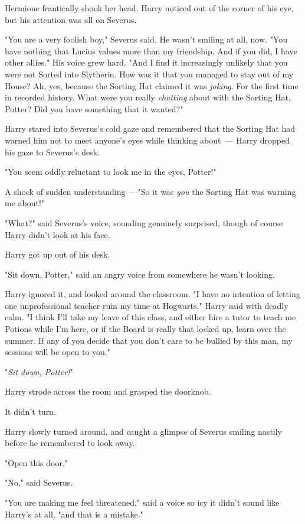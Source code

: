 Hermione frantically shook her head. Harry noticed out of the corner of his
eye, but his attention was all on Severus.

"You are a very foolish boy," Severus said. He wasn't smiling at all, now. "You
have nothing that Lucius values more than my friendship. And if you did, I have
other allies." His voice grew hard. "And I find it increasingly unlikely that
you were not Sorted into Slytherin. How was it that you managed to stay out of
my House? Ah, yes, because the Sorting Hat claimed it was \emph{joking}. For
the first time in recorded history. What were you really \emph{chatting} about
with the Sorting Hat, Potter? Did you have something that it wanted?"

Harry stared into Severus's cold gaze and remembered that the Sorting Hat had
warned him not to meet anyone's eyes while thinking about~--- Harry dropped his
gaze to Severus's desk.

"You seem oddly reluctant to look me in the eyes, Potter!"

A shock of sudden understanding~---"So it was \emph{you} the Sorting Hat was
warning me about!"

"What?" said Severus's voice, sounding genuinely surprised, though of course
Harry didn't look at his face.

Harry got up out of his desk.

"Sit down, Potter," said an angry voice from somewhere he wasn't looking.

Harry ignored it, and looked around the classroom. "I have no intention of
letting one unprofessional teacher ruin my time at Hogwarts," Harry said with
deadly calm. "I think I'll take my leave of this class, and either hire a tutor
to teach me Potions while I'm here, or if the Board is really that locked up,
learn over the summer. If any of you decide that you don't care to be bullied
by this man, my sessions will be open to you."

"\emph{Sit down, Potter!}"

Harry strode across the room and grasped the doorknob.

It didn't turn.

Harry slowly turned around, and caught a glimpse of Severus smiling nastily
before he remembered to look away.

"Open this door."

"No," said Severus.

"You are making me feel threatened," said a voice so icy it didn't sound like
Harry's at all, "and that is a mistake."

